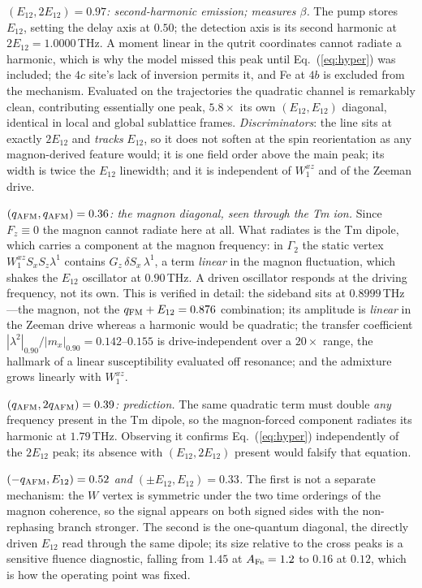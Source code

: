 \documentclass[aps,prb,twocolumn,superscriptaddress,longbibliography]{revtex4-2}
\newcommand{\qafm}{q_{\rm AFM}}
\newcommand{\qfm}{q_{\rm FM}}
\begin{document}
\emph{$(E_{12},2E_{12})=0.97$: second-harmonic emission; measures
$\beta$.}  The pump stores $E_{12}$, setting the delay axis at $0.50$;
the detection axis is its second harmonic at $2E_{12}=1.0000$\,THz.  A
moment linear in the qutrit coordinates cannot radiate a harmonic, which
is why the model missed this peak until Eq.~(\ref{eq:hyper}) was
included; the $4c$ site's lack of inversion permits it, and Fe at $4b$
is excluded from the mechanism.  Evaluated on the trajectories the
quadratic channel is remarkably clean, contributing essentially one peak,
$5.8\times$ its own $(E_{12},E_{12})$ diagonal, identical in local and
global sublattice frames.  \emph{Discriminators}: the line sits at
exactly $2E_{12}$ and \emph{tracks} $E_{12}$, so it does not soften at
the spin reorientation as any magnon-derived feature would; it is one
field order above the main peak; its width is twice the $E_{12}$
linewidth; and it is independent of $W^{xz}_1$ and of the Zeeman drive.

\emph{$(\qafm,\qafm)=0.36$: the magnon diagonal, seen through the Tm
ion.}  Since $F_z\equiv0$ the magnon cannot radiate here at all.  What
radiates is the Tm dipole, which carries a component at the magnon
frequency: in $\Gamma_2$ the static vertex $W^{xz}_1S_xS_z\lambda^1$
contains $G_z\,\delta S_x\,\lambda^1$, a term \emph{linear} in the magnon
fluctuation, which shakes the $E_{12}$ oscillator at $0.90$\,THz.  A
driven oscillator responds at the driving frequency, not its own.  This
is verified in detail: the sideband sits at $0.8999$\,THz---the magnon,
not the $\qfm+E_{12}=0.876$ combination; its amplitude is \emph{linear}
in the Zeeman drive whereas a harmonic would be quadratic; the transfer
coefficient $|\lambda^2|_{0.90}/|m_x|_{0.90}=0.142$--$0.155$ is
drive-independent over a $20\times$ range, the hallmark of a linear
susceptibility evaluated off resonance; and the admixture grows linearly
with $W^{xz}_1$.

\emph{$(\qafm,2\qafm)=0.39$: prediction.}  The same quadratic term must
double \emph{any} frequency present in the Tm dipole, so the
magnon-forced component radiates its harmonic at $1.79$\,THz.  Observing
it confirms Eq.~(\ref{eq:hyper}) independently of the $2E_{12}$ peak; its
absence with $(E_{12},2E_{12})$ present would falsify that equation.

\emph{$(-\qafm,E_{12})=0.52$ and $(\pm E_{12},E_{12})=0.33$.}  The first
is not a separate mechanism: the $W$ vertex is symmetric under the two
time orderings of the magnon coherence, so the signal appears on both
signed sides with the non-rephasing branch stronger.  The second is the
one-quantum diagonal, the directly driven $E_{12}$ read through the same
dipole; its size relative to the cross peaks is a sensitive fluence
diagnostic, falling from $1.45$ at $A_{\rm Fe}=1.2$ to $0.16$ at $0.12$,
which is how the operating point was fixed.
\end{document}
